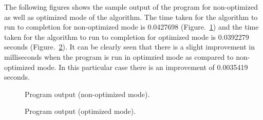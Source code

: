 The following figures shows the sample output of the program for non-optimized as well as optimized mode of the algorithm. The time taken for the algorithm to run to completion for non-optimized mode is 0.0427698 (Figure.~\ref{fig26}) and the time taken for the algorithm to run to completion for optimized mode is 0.0392279 seconds (Figure.~\ref{fig27}). It can be clearly seen that there is a slight improvement in milliseconds when the program is run in optimzied mode as compared to non-optimized mode. In this particular case there is an improvement of 0.0035419 seconds.
\begin{figure}[ht]
  \begin{center}
  \end{center}
  \centering
	\parbox{5in}{\caption{Program output (non-optimized mode).} \label{fig26}} 
\end{figure}
\begin{figure}[ht]
  \begin{center}
  \end{center}
  \centering
	\parbox{5in}{\caption{Program output (optimized mode).} \label{fig27}} 
\end{figure}

